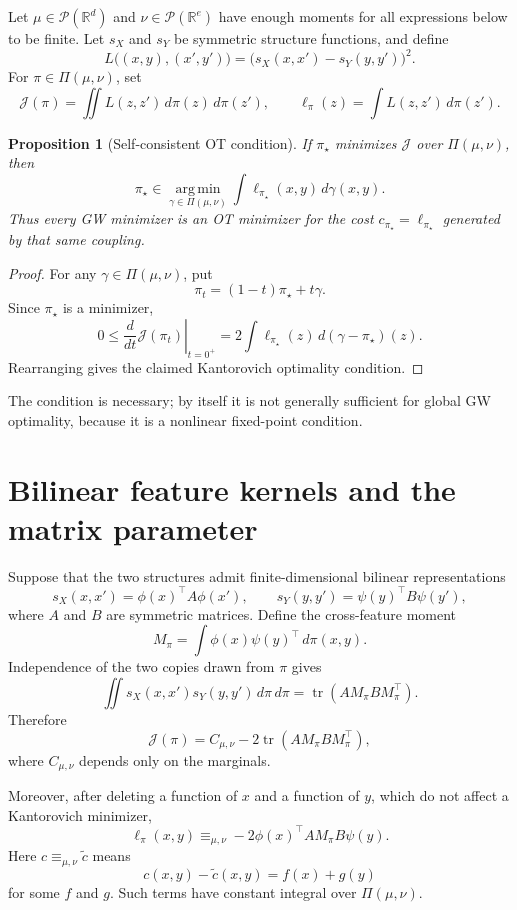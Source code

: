\documentclass[11pt]{article}
\newtheorem{proposition}{Proposition}
\newcommand{\R}{\mathbb{R}}
\newcommand{\cP}{\mathcal{P}}
\newcommand{\cJ}{\mathcal{J}}
\newcommand{\PiCouplings}{\Pi}
\newcommand{\tr}{\operatorname{tr}}
\newcommand{\argmin}{\operatorname*{arg\,min}}
\newcommand{\equivmarg}{\equiv_{\mu,\nu}}
\begin{document}
Let $\mu\in\cP(\R^d)$ and $\nu\in\cP(\R^e)$ have enough moments for all
expressions below to be finite. Let $s_X$ and $s_Y$ be symmetric structure
functions, and define
\[
L\bigl((x,y),(x',y')\bigr)
=
\bigl(s_X(x,x')-s_Y(y,y')\bigr)^2.
\]
For $\pi\in\PiCouplings(\mu,\nu)$, set
\[
\cJ(\pi)=\iint L(z,z')\,d\pi(z)\,d\pi(z'),
\qquad
\ell_\pi(z)=\int L(z,z')\,d\pi(z').
\]

\begin{proposition}[Self-consistent OT condition]
If $\pi_\star$ minimizes $\cJ$ over $\PiCouplings(\mu,\nu)$, then
\[
\pi_\star
\in
\argmin_{\gamma\in\PiCouplings(\mu,\nu)}
\int \ell_{\pi_\star}(x,y)\,d\gamma(x,y).
\]
Thus every GW minimizer is an OT minimizer for the cost
$c_{\pi_\star}=\ell_{\pi_\star}$ generated by that same coupling.
\end{proposition}

\begin{proof}
For any $\gamma\in\PiCouplings(\mu,\nu)$, put
\[
\pi_t=(1-t)\pi_\star+t\gamma.
\]
Since $\pi_\star$ is a minimizer,
\[
0\leq
\left.\frac{d}{dt}\cJ(\pi_t)\right|_{t=0^+}
=
2\int \ell_{\pi_\star}(z)\,d(\gamma-\pi_\star)(z).
\]
Rearranging gives the claimed Kantorovich optimality condition.
\end{proof}

The condition is necessary; by itself it is not generally sufficient for
global GW optimality, because it is a nonlinear fixed-point condition.

\section{Bilinear feature kernels and the matrix parameter}

Suppose that the two structures admit finite-dimensional bilinear
representations
\[
s_X(x,x')=\phi(x)^\top A\phi(x'),
\qquad
s_Y(y,y')=\psi(y)^\top B\psi(y'),
\]
where $A$ and $B$ are symmetric matrices. Define the cross-feature moment
\[
M_\pi=\int \phi(x)\psi(y)^\top\,d\pi(x,y).
\]
Independence of the two copies drawn from $\pi$ gives
\[
\iint s_X(x,x')s_Y(y,y')\,d\pi\,d\pi
=
\tr\!\left(A M_\pi B M_\pi^\top\right).
\]
Therefore
\[
\cJ(\pi)
=
C_{\mu,\nu}
-2\tr\!\left(A M_\pi B M_\pi^\top\right),
\]
where $C_{\mu,\nu}$ depends only on the marginals.

Moreover, after deleting a function of $x$ and a function of $y$, which do
not affect a Kantorovich minimizer,
\[
\ell_\pi(x,y)
\equivmarg
-2\phi(x)^\top A M_\pi B\psi(y).
\]
Here $c\equivmarg\widetilde c$ means
\[
c(x,y)-\widetilde c(x,y)=f(x)+g(y)
\]
for some $f$ and $g$. Such terms have constant integral over
$\PiCouplings(\mu,\nu)$.
\end{document}
